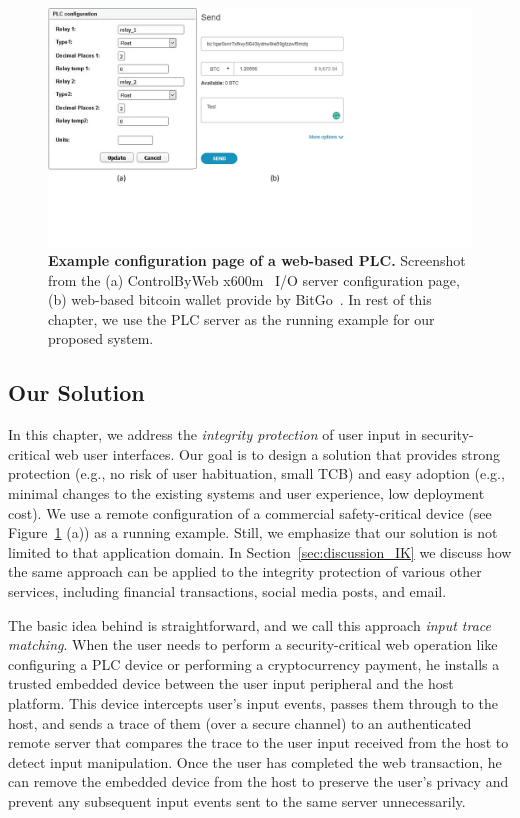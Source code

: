 \begin{figure}[t]
  \centering
    \includegraphics[trim={0 4cm 10cm 0},clip,width=\linewidth]{chapters/IntegriKey/images/config_pages.pdf}
    \caption[Example configuration page of a web-based PLC]{\textbf{Example configuration page of a web-based PLC.} Screenshot from the (a) ControlByWeb x600m~\cite{controlbyweb} I/O server configuration page, (b) web-based bitcoin wallet provide by BitGo~\cite{bitgo}. In rest of this chapter, we use the PLC server as the running example for our proposed system.}

    \label{fig:PLC}
\end{figure}


\subsection{Our Solution} 

In this chapter, we address the \emph{integrity protection} of user input in security-critical web user interfaces. Our goal is to design a solution that provides strong protection (e.g., no risk of user habituation, small TCB) and easy adoption (e.g., minimal changes to the existing systems and user experience, low deployment cost). We use a remote configuration of a commercial safety-critical device (see Figure~\ref{fig:PLC} (a)) as a running example. Still, we emphasize that our solution is not limited to that application domain. In Section~\ref{sec:discussion_IK} we discuss how the same approach can be applied to the integrity protection of various other services, including financial transactions, social media posts, and email.

The basic idea behind \name is straightforward, and we call this approach \emph{input trace matching}.  When the user needs to perform a security-critical web operation like configuring a PLC device or performing a cryptocurrency payment, he installs a trusted embedded device between the user input peripheral and the host platform. This device intercepts user's input events, passes them through to the host, and sends a trace of them (over a secure channel) to an authenticated remote server that compares the trace to the user input received from the host to detect input manipulation. Once the user has completed the web transaction, he can remove the embedded device from the host to preserve the user's privacy and prevent any subsequent input events sent to the same server unnecessarily.

